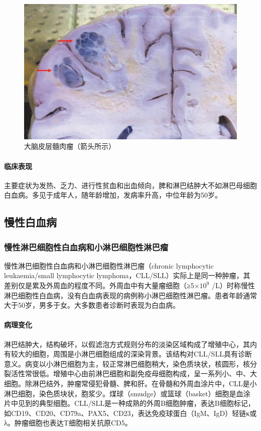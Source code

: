 \begin{figure}[!htbp]
 \centering
 \includegraphics{./images/Image00146.jpg}
 \captionsetup{justification=centering}
 \caption{大脑皮层髓肉瘤（箭头所示）}
 \label{fig9-5}
  \end{figure} 

\paragraph{临床表现}
主要症状为发热、乏力、进行性贫血和出血倾向，脾和淋巴结肿大不如淋巴母细胞白血病。多见于成年人，随年龄增加，发病率升高，中位年龄为50岁。

\subsection{慢性白血病}

\subsubsection{慢性淋巴细胞性白血病和小淋巴细胞性淋巴瘤}

慢性淋巴细胞性白血病和小淋巴细胞性淋巴瘤（chronic lymphocytic
leukaemia/small lymphocytic
lymphoma，CLL/SLL）实际上是同一种肿瘤，其差别仅是累及外周血的程度不同。外周血中有大量瘤细胞（≥5$\times 10^9$
/L）时称慢性淋巴细胞性白血病，没有白血病表现的病例称小淋巴细胞性淋巴瘤。患者年龄通常大于50岁，男多于女。大多数患者诊断时表现为白血病。

\paragraph{病理变化}
淋巴结肿大，结构破坏，以假滤泡方式规则分布的淡染区域构成了增殖中心，其内有较大的细胞，周围是小淋巴细胞组成的深染背景。该结构对CLL/SLL具有诊断意义。病变以小淋巴细胞为主，较正常淋巴细胞稍大，染色质块状，核圆形，核分裂活性常很低。增殖中心由前淋巴细胞和副免疫母细胞构成，呈一系列小、中、大细胞。除淋巴结外，肿瘤常侵犯骨髓、脾和肝。在骨髓和外周血涂片中，CLL是小淋巴细胞，染色质块状，胞浆少。煤球（smudge）或篮球（basket）细胞是血涂片中见到的典型细胞。CLL/SLL是一种成熟的外周B细胞肿瘤，表达B细胞标记，如CD19、CD20、CD79a、PAX5、CD23，表达免疫球蛋白（IgM、IgD）轻链κ或λ。肿瘤细胞也表达T细胞相关抗原CD5。


